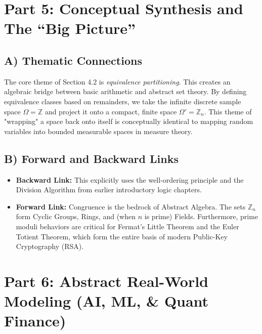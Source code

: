 \documentclass[11pt]{article}
\begin{document}
\newpage
\section{Part 5: Conceptual Synthesis and The ``Big Picture''}

\subsection{A) Thematic Connections}
The core theme of Section 4.2 is \textit{equivalence partitioning}. This creates an algebraic bridge between basic arithmetic and abstract set theory. By defining equivalence classes based on remainders, we take the infinite discrete sample space $\Omega = \mathbb{Z}$ and project it onto a compact, finite space $\Omega' = \mathbb{Z}_n$. This theme of "wrapping" a space back onto itself is conceptually identical to mapping random variables into bounded measurable spaces in measure theory.

\subsection{B) Forward and Backward Links}
\begin{itemize}
    \item \textbf{Backward Link:} This explicitly uses the well-ordering principle and the Division Algorithm from earlier introductory logic chapters.
    \item \textbf{Forward Link:} Congruence is the bedrock of Abstract Algebra. The sets $\mathbb{Z}_n$ form Cyclic Groups, Rings, and (when $n$ is prime) Fields. Furthermore, prime moduli behaviors are critical for Fermat's Little Theorem and the Euler Totient Theorem, which form the entire basis of modern Public-Key Cryptography (RSA).
\end{itemize}

\newpage
\section{Part 6: Abstract Real-World Modeling (AI, ML, \& Quant Finance)}
\end{document}
